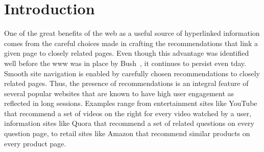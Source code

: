 \begin{abstract}

\iffalse
In this paper, we study the problem of graph recommendations as
variants of bipartite matching problems. We consider the problem
of solving such matching problems in practice at web-scale. To achieve
this we introduce several models to simulate underlying input graph
structures. We then analyze the conditions under which a random sample
of edges using constant memory already suffices to be a
'good' recommendation algorithm as opposed the cases when we may consider
the more classical and involved linear memory polynomial time algorithms.
We also show how to select the number of recommendations per item while
building a website so that there exists a 'perfect' graph recommendation.
\fi

\end{abstract}

\section{Introduction}

One of the great benefits of the web as a useful source of hyperlinked
information comes from the careful choices made in crafting the recommendations
that link a given page to closely related pages. Even though this advantage was
identified well before the www was in place by Bush~\cite{Bush45}, it continues
to persist even tday. Smooth site navigation is enabled by carefully chosen
recommendations to closely related pages. Thus, the presence of recommendations
is an integral feature of several popular websites that are known to have high
user engagement as reflected in long sessions. Examples range from 
entertainment sites like YouTube that recommend a set of videos on the right
for every video watched by a user, information sites like Quora that recommend
a set of related questions on every question page, to retail sites like Amazon
that recommend similar products on every product page. \vs

